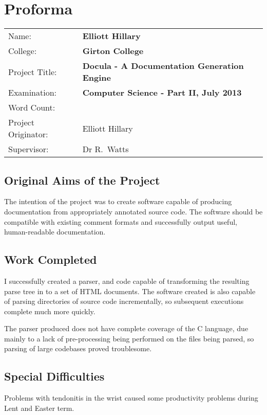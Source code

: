 \chapter*{Proforma}

{\large
  \begin{tabular}{l l}
    Name:               & \bf Elliott Hillary                            \\
    College:            & \bf Girton College                             \\
    Project Title:      & \bf Docula - A Documentation Generation Engine \\
    Examination:        & \bf Computer Science - Part II, July 2013      \\
    Word Count:         & \bf                  \\
    Project Originator: & Elliott Hillary                                \\
    Supervisor:         & Dr R.~Watts                                    \\
  \end{tabular}
}

\section*{Original Aims of the Project}
The intention of the project was to create software capable of producing
documentation from appropriately annotated source code. The software should be
compatible with existing comment formats and successfully output useful,
human-readable documentation.


\section*{Work Completed}
I successfully created a parser, and code capable of transforming the
resulting parse tree in to a set of HTML documents. The software created is also
capable of parsing directories of source code incrementally, so subsequent
executions complete much more quickly.

The parser produced does not have complete coverage of the C language, due
mainly to a lack of pre-processing being performed on the files being parsed, so
parsing of large codebases proved troublesome.


\section*{Special Difficulties}
Problems with tendonitis in the wrist caused some productivity problems
during Lent and Easter term.
